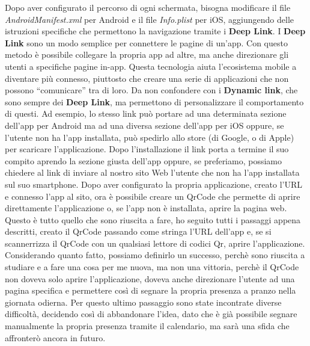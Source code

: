 \newline
Dopo aver configurato il percorso di ogni schermata, bisogna modificare il file \emph{AndroidManifest.xml} per Android e il file \emph{Info.plist} per iOS, aggiungendo delle istruzioni specifiche che permettono la navigazione tramite i \textbf{Deep Link}.\newline
\newline
I \textbf{Deep Link} sono un modo semplice per connettere le pagine di un'app.\newline
Con questo metodo è possibile collegare la propria app ad altre, ma anche direzionare gli utenti a specifiche pagine in-app.\newline
Questa tecnologia aiuta l’ecosistema mobile a diventare più connesso, piuttosto che creare una serie di applicazioni che non possono “comunicare” tra di loro.\newline
Da non confondere con i \textbf{Dynamic link}, che sono sempre dei \textbf{Deep Link}, ma permettono di personalizzare il comportamento di questi.\newline
Ad esempio, lo stesso link può portare ad una determinata sezione dell'app per Android ma ad una diversa sezione dell'app per iOS oppure, se l'utente non ha l'app installata, può spedirlo allo store (di Google, o di Apple) per scaricare l'applicazione.\newline
Dopo l'installazione il link porta a termine il suo compito aprendo la sezione giusta dell'app oppure, se preferiamo, possiamo chiedere al link di inviare al nostro sito Web l'utente che non ha l'app installata sul suo smartphone.\newline
\newline
Dopo aver configurato la propria applicazione, creato l'URL e connesso l'app al sito, ora è possibile creare un QrCode che permette di aprire direttamente l'applicazione o, se l'app non è installata, aprire la pagina web.\newline
Questo è tutto quello che sono riuscita a fare, ho seguito tutti i passaggi appena descritti, creato il QrCode passando come stringa l'URL dell'app e, se si scannerrizza il QrCode con un qualsiasi lettore di codici Qr, aprire l'applicazione.\newline
\newline
Considerando quanto fatto, possiamo definirlo un successo, perchè sono riuscita a studiare e a fare una cosa per me nuova, ma non una vittoria, perchè il QrCode non doveva solo aprire l'applicazione, doveva anche direzionare l'utente ad una pagina specifica e permettere così di segnare la propria presenza a pranzo nella giornata odierna.\newline
Per questo ultimo passaggio sono state incontrate diverse difficoltà, decidendo così di abbandonare l'idea, dato che è già possibile segnare manualmente la propria presenza tramite il calendario, ma sarà una sfida che affronterò ancora in futuro.
